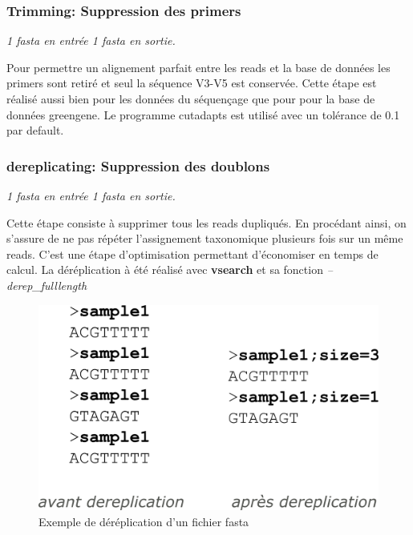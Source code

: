 \documentclass[12pt,a4paper]{article}
\begin{document}
\subsubsection{Trimming: Suppression des primers} \begin{center}\emph{1 fasta en entrée 1 fasta en sortie. } \end{center}

Pour permettre un alignement parfait entre les reads et la base de données les primers sont retiré et seul la séquence V3-V5 est conservée. Cette étape est réalisé aussi bien pour les données du séquençage que pour pour la base de données greengene.  
Le programme cutadapts est utilisé avec un tolérance de 0.1 par default. 

\subsubsection{dereplicating: Suppression des doublons}\begin{center}\emph{1 fasta en entrée 1 fasta en sortie. } \end{center}

Cette étape consiste à supprimer tous les reads dupliqués. En procédant ainsi, on s'assure de ne pas répéter l'assignement taxonomique plusieurs fois sur un même reads. C'est une étape d'optimisation permettant d'économiser en temps de calcul. La déréplication à été réalisé avec \textbf{vsearch} et sa fonction \textit{--derep\_fulllength }

\begin{figure}[ht]
\begin{center}
\includegraphics[scale=0.4]{img/dereplication.png}\hfill
\end{center}
\caption{Exemple de déréplication d'un fichier fasta}
\label{dag}
\end{figure}
\end{document}
